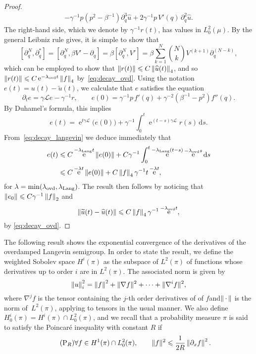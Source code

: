 \documentclass[11pt,a4paper]{article}
\DeclareMathOperator{\e}{e}
\newcommand{\commut}[2]{[#1, #2]}
\newcommand{\dummy}{\,\cdot\,}
\renewcommand{\d}{\mathrm d}
\theoremstyle{plain}
\numberwithin{equation}{section}
\renewcommand{\leq}{\leqslant}
\begin{document}
\begin{proof}
\begin{align*}
        - \gamma^{-1} p (p^2 - \beta^{-1}) \partial_q^{3} \widehat u + 2 \gamma^{-1} p \, V'(q) \, \partial_q^2 \widehat u.
    \end{align*}
    The right-hand side, which we denote by $\gamma^{-1} r(t)$, has values in $L^2_0(\mu)$.
    By the general Leibniz rule gives,
    it is simple to show that
    \[
        \commut{\partial_q^N}{\partial_q^*}
        = \commut{\partial_q^N}{\beta V' - \partial_q}
        = \beta \commut{\partial_q^N}{V'}
        = \beta \sum_{k=1}^{N} {N \choose k} V^{(k+1)} \partial_q^{(N-k)},
    \]
    which can be employed to show that $\norm{r(t)} \leq C \norm{\widehat u(t)}_4$,
    and so $\norm{r(t)} \leq C \e^{-\lambda_{\rm ovd} t} \norm{f}_4$ by~\eqref{eq:decay_ovd}.
    Using the notation $e(t) = u(t) - \widetilde u(t)$,
    we calculate that $e$ satisfies the equation
    \[
        \partial_t e = \gamma \mathcal L e - \gamma^{-1} r, \qquad
        e(0) = \gamma^{-1} p \, f'(q) + \gamma^{-2} (\beta^{-1} - p^2) f''(q).
    \]
    By Duhamel's formula,
    this implies
    \[
        e(t) = \e^{t \gamma \mathcal L} \bigl( e(0) \bigr) + \gamma^{-1} \int_{0}^{t} \e^{(t- s) \gamma \mathcal L} r(s) \, \d s.
    \]
    From~\eqref{eq:decay_langevin} we deduce immediately that
    \begin{align*}
        e(t)
        &\leq C \e^{- \lambda_{\rm Lang} t} \norm{e(0)}
        + C \gamma^{-1} \int_{0}^{t} \e^{- \lambda_{\rm Lang} (t-s)} \e^{-\lambda_{\rm ovd} s} \d s \\
        &\leq C \e^{- \lambda t} \norm{e(0)} + C \norm{f}_4 \gamma^{-1} t \e^{- \lambda t},
    \end{align*}
    for $\lambda = \min(\lambda_{\rm ovd}, \lambda_{\rm Lang})$.
    The result then follows by noticing that $\norm{e_0} \leq C \gamma^{-1} \norm{f}_2$ and
    \[
        \norm{\widetilde u(t) - \widehat u(t)} \leq C \norm{f}_4 \gamma^{-1} \e^{- \lambda_{\rm ovd} t},
    \]
    by \eqref{eq:decay_ovd}.
\end{proof}

The following result shows the exponential convergence of the derivatives of the overdamped Langevin semigroup.
In order to state the result, we define the weighted Sobolev space $H^i(\pi)$ as the subspace of $L^2(\pi)$
of functions whose derivatives up to order $i$ are in $L^2(\pi)$.
The associated norm is given by
\[
    \norm{u}_i^2 = \norm{f}^2 + \norm*{\nabla f}^2 + \dotsb + \norm*{\nabla^i f}^2,
\]
where  $\nabla^j f$ is the tensor containing the $j$-th order derivatives of of $f$and$\norm{\dummy}$ is the norm of~$L^2(\pi)$,
applying to tensors in the usual manner.
We also define $H^{i}_0(\pi) = H^i(\pi) \cap L^2_0(\pi)$,
and we recall that a probability measure $\pi$ is said to satisfy the Poincaré inequality with constant $R$ if
\begin{equation}
    \label{eq:poincare}
    \tag{P$_R$}
    \forall f \in H^1(\pi) \cap L^2_0(\pi), \qquad
    \norm*{f}^2 \leq \frac{1}{2R} \norm{\partial_x f}^2.
\end{equation}
\end{document}
